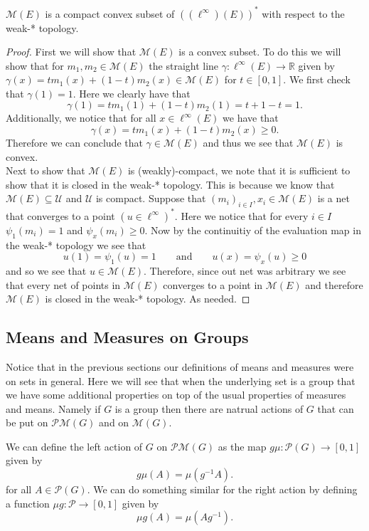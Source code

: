 \begin{thm}
  $\mathcal{M}(E)$ is a compact convex subset of $((\ell^{\infty})(E))^{*}$ with
  respect to the weak-* topology.
\end{thm}
\begin{proof}
  First we will show that $\mathcal{M}(E)$ is a convex subset. To do this we
  will show that for $m_1, m_2 \in \mathcal{M}(E)$ the straight line $\gamma:
  \ell^{\infty}(E) \to \mathbb{R}$ given by $\gamma(x) = tm_1(x) + (1-t)m_2(x) \in 
  \mathcal{M}(E)$ for $t \in [0, 1]$. We first check that $\gamma(1) = 1$. 
  Here we clearly have that
  \[
  \gamma(1) = tm_1(1) + (1 - t)m_2(1) = t + 1 - t = 1
  .\] 
  Additionally, we notice that for all $x \in \ell^{\infty}(E)$ we have that
  \[
  \gamma(x) = tm_1(x) + (1 - t)m_2(x) \ge 0
  .\] 
  Therefore we can conclude that $\gamma \in \mathcal{M}(E)$ and thus we see
  that $\mathcal{M}(E)$ is convex.\\
  Next to show that $\mathcal{M}(E)$ is (weakly)-compact, we note that it is 
  sufficient to show that it is closed in the weak-* topology. This is because
  we know that $\mathcal{M}(E) \subseteq \mathcal{U}$ and $\mathcal{U}$ is
  compact. Suppose that $(m_i)_{i \in I}, x_i \in \mathcal{M}(E)$ is a net 
  that converges to a point $(u \in \ell^{\infty})^{*}$. Here we notice that
  for every $i \in I$ $\psi_1(m_i) = 1$ and $\psi_x(m_i) \ge 0$. Now by the
  continuitiy of the evaluation map in the weak-* topology we see that 
  \[
  u(1) = \psi_1(u) = 1 \qquad \textrm{and} \qquad u(x) = \psi_x(u) \ge 0 
  \] 
  and so we see that $u \in \mathcal{M}(E)$. Therefore, since out net was
  arbitrary we see that every net of points in $\mathcal{M}(E)$ converges to
  a point in $\mathcal{M}(E)$ and therefore $\mathcal{M}(E)$ is closed in the
  weak-* topology. As needed.
\end{proof}

\subsection{Means and Measures on Groups}

Notice that in the previous sections our definitions of means and measures were
on sets in general. Here we will see that when the underlying set is a group
that we have some additional properties on top of the usual properties of
measures and means. Namely if $G$ is a group then there are natrual actions of
$G$ that can be put on $\mathcal{PM}(G)$ and on $\mathcal{M}(G)$. 

\begin{defn}
  We can define the left action of $G$ on $\mathcal{PM}(G)$ as the map $g\mu:
  \mathcal{P}(G) \to [0, 1]$ given by
  \[
  g\mu(A) = \mu(g^{-1}A)
  .\] 
  for all $A \in \mathcal{P}(G)$. We can do something similar for the right
  action by defining a function $\mu g: \mathcal{P} \to [0,1]$ given by
  \[
  \mu g(A) = \mu(A g^{-1})
  .\] 
\end{defn}

